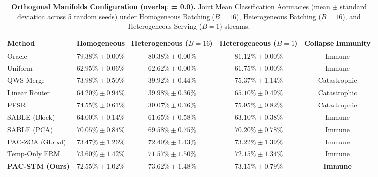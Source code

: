 \begin{table}[t]
\caption{\textbf{Orthogonal Manifolds Configuration (overlap = 0.0).} Joint Mean Classification Accuracies (mean $\pm$ standard deviation across 5 random seeds) under Homogeneous Batching ($B=16$), Heterogeneous Batching ($B=16$), and Heterogeneous Serving ($B=1$) streams.}
\label{tab:orthogonal}
\vskip 0.15in
\begin{center}
\begin{small}
\begin{sc}
\begin{tabular}{lcccc}
\toprule
Method & Homogeneous & Heterogeneous ($B=16$) & Heterogeneous ($B=1$) & Collapse Immunity \\
\midrule
\textnormal{Oracle} & $79.38\% \pm 0.00\%$ & $80.38\% \pm 0.00\%$ & $81.12\% \pm 0.00\%$ & \textnormal{Immune} \\
\textnormal{Uniform} & $62.95\% \pm 0.06\%$ & $62.62\% \pm 0.00\%$ & $61.75\% \pm 0.00\%$ & \textnormal{Immune} \\
\midrule
\textnormal{QWS-Merge} & $73.98\% \pm 0.50\%$ & $39.92\% \pm 0.44\%$ & $75.37\% \pm 1.14\%$ & \textnormal{Catastrophic} \\
\textnormal{Linear Router} & $64.20\% \pm 0.94\%$ & $39.98\% \pm 0.36\%$ & $65.10\% \pm 0.49\%$ & \textnormal{Catastrophic} \\
\textnormal{PFSR} & $74.55\% \pm 0.61\%$ & $39.07\% \pm 0.36\%$ & $75.95\% \pm 0.82\%$ & \textnormal{Catastrophic} \\
\midrule
\textnormal{SABLE (Block)} & $64.00\% \pm 0.14\%$ & $61.65\% \pm 0.58\%$ & $63.10\% \pm 0.38\%$ & \textnormal{Immune} \\
\textnormal{SABLE (PCA)} & $70.05\% \pm 0.84\%$ & $69.58\% \pm 0.75\%$ & $70.20\% \pm 0.78\%$ & \textnormal{Immune} \\
\textnormal{PAC-ZCA (Global)} & $73.47\% \pm 1.26\%$ & $72.40\% \pm 1.43\%$ & $73.22\% \pm 1.39\%$ & \textnormal{Immune} \\
\textnormal{Temp-Only ERM} & $73.60\% \pm 1.42\%$ & $71.57\% \pm 1.50\%$ & $72.15\% \pm 1.34\%$ & \textnormal{Immune} \\
\midrule
\textnormal{\textbf{PAC-STM (Ours)}} & $\mathbf{72.55\% \pm 1.02\%}$ & $\mathbf{73.62\% \pm 1.48\%}$ & $\mathbf{73.15\% \pm 0.79\%}$ & \textnormal{\textbf{Immune}} \\
\bottomrule
\end{tabular}
\end{sc}
\end{small}
\end{center}
\vskip -0.1in
\end{table}

